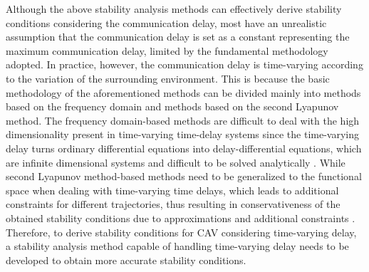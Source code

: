 \documentclass[a4paper]{cas-sc}
\begin{document}
Although the above stability analysis methods can effectively derive stability conditions considering the communication delay, most have an unrealistic assumption that the communication delay is set as a constant representing the maximum communication delay, limited by the fundamental methodology adopted. In practice, however, the communication delay is time-varying according to the variation of the surrounding environment. This is because the basic methodology of the aforementioned methods can be divided mainly into methods based on the frequency domain and methods based on the second Lyapunov method. The frequency domain-based methods are difficult to deal with the high dimensionality present in time-varying time-delay systems since the time-varying delay turns ordinary differential equations into delay-differential equations, which are infinite dimensional systems and difficult to be solved analytically \citep{lhachemi2020feedback}. While second Lyapunov method-based methods need to be generalized to the functional space when dealing with time-varying time delays, which leads to additional constraints for different trajectories, thus resulting in conservativeness of the obtained stability conditions due to approximations and additional constraints \citep{fridman2006descriptor,wang2016fuzzy,lian2020dissipativity}. Therefore, to derive stability conditions for CAV considering time-varying delay, a stability analysis method capable of handling time-varying delay needs to be developed to obtain more accurate stability conditions.
\end{document}
